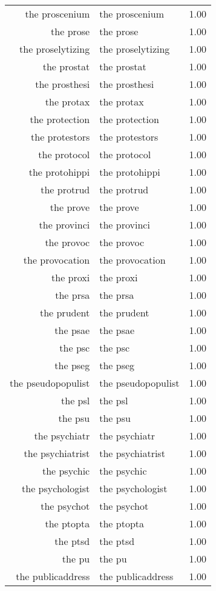 \begin{table}[ht]
\begin{tabular}{rlr}
  the proscenium & the proscenium & 1.00 \\ 
  the prose & the prose & 1.00 \\ 
  the proselytizing & the proselytizing & 1.00 \\ 
  the prostat & the prostat & 1.00 \\ 
  the prosthesi & the prosthesi & 1.00 \\ 
  the protax & the protax & 1.00 \\ 
  the protection & the protection & 1.00 \\ 
  the protestors & the protestors & 1.00 \\ 
  the protocol & the protocol & 1.00 \\ 
  the protohippi & the protohippi & 1.00 \\ 
  the protrud & the protrud & 1.00 \\ 
  the prove & the prove & 1.00 \\ 
  the provinci & the provinci & 1.00 \\ 
  the provoc & the provoc & 1.00 \\ 
  the provocation & the provocation & 1.00 \\ 
  the proxi & the proxi & 1.00 \\ 
  the prsa & the prsa & 1.00 \\ 
  the prudent & the prudent & 1.00 \\ 
  the psae & the psae & 1.00 \\ 
  the psc & the psc & 1.00 \\ 
  the pseg & the pseg & 1.00 \\ 
  the pseudopopulist & the pseudopopulist & 1.00 \\ 
  the psl & the psl & 1.00 \\ 
  the psu & the psu & 1.00 \\ 
  the psychiatr & the psychiatr & 1.00 \\ 
  the psychiatrist & the psychiatrist & 1.00 \\ 
  the psychic & the psychic & 1.00 \\ 
  the psychologist & the psychologist & 1.00 \\ 
  the psychot & the psychot & 1.00 \\ 
  the ptopta & the ptopta & 1.00 \\ 
  the ptsd & the ptsd & 1.00 \\ 
  the pu & the pu & 1.00 \\ 
  the publicaddress & the publicaddress & 1.00 \\ 

\end{tabular}
\end{table}

